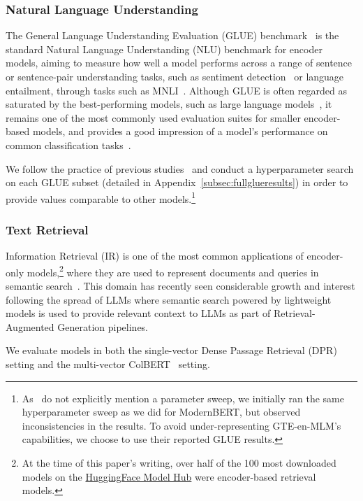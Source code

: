 \documentclass[11pt]{article}
\begin{document}
\subsubsection{Natural Language Understanding}
\label{subsubsec:evalglue}

The General Language Understanding Evaluation (GLUE) benchmark~\cite{wang-etal-2018-glue} is the standard Natural Language Understanding (NLU) benchmark for encoder models, aiming to measure how well a model performs across a range of sentence or sentence-pair understanding tasks, such as sentiment detection~\cite{sst2} or language entailment, through tasks such as MNLI~\cite{MNLI}. Although GLUE is often regarded as saturated by the best-performing models, such as large language models~\cite{llmsurvey}, it remains one of the most commonly used evaluation suites for smaller encoder-based models, and provides a good impression of a model's performance on common classification tasks~\cite{mosaic,gte,debertav3}. 

We follow the practice of previous studies~\cite{bert,roberta,debertav3} and conduct a hyperparameter search on each GLUE subset (detailed in Appendix~\ref{subsec:fullglueresults}) in order to provide values comparable to other models.\footnote{As~\cite{gte} do not explicitly mention a parameter sweep, we initially ran the same hyperparameter sweep as we did for ModernBERT, but observed inconsistencies in the results. To avoid under-representing GTE-en-MLM's capabilities, we choose to use their reported GLUE results.}


\subsubsection{Text Retrieval}
\label{subsubsec:dpr}

Information Retrieval (IR) is one of the most common applications of encoder-only models,\footnote{At the time of this paper's writing, over half of the 100 most downloaded models on the \href{https://huggingface.co/models}{HuggingFace Model Hub} were encoder-based retrieval models.} where they are used to represent documents and queries in semantic search~\cite{DBLP:conf/emnlp/KarpukhinOMLWEC20}. This domain has recently seen considerable growth and interest following the spread of LLMs where semantic search powered by lightweight models is used to provide relevant context to LLMs as part of Retrieval-Augmented Generation pipelines.


We evaluate models in both the single-vector Dense Passage Retrieval (DPR)~\cite{DBLP:conf/emnlp/KarpukhinOMLWEC20} setting and the multi-vector ColBERT~\cite{DBLP:conf/sigir/KhattabZ20} setting. 
\end{document}

